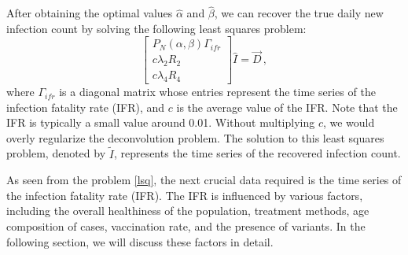 \documentclass[sn-mathphys,Numbered]{sn-jnl}
\begin{document}
After obtaining the optimal values $\hat{\alpha}$ and $\hat{\beta}$, we can recover the true daily new infection count by solving the following least squares problem:
\begin{equation}
    \begin{bmatrix}
        P_{N}(\alpha, \beta) \Gamma_{ifr}\\
        c\lambda_{2}  R_{2}\\
        c\lambda_{4} R_{4}
    \end{bmatrix}
    \hat{I} = \vec{D} \,,\label{lsq}
\end{equation}
where $\Gamma_{ifr}$ is a diagonal matrix whose entries represent the time series of the infection fatality rate (IFR), and $c$ is the average value of the IFR. Note that the IFR is typically a small value around 0.01. Without multiplying $c$, we would overly regularize the deconvolution problem. The solution to this least squares problem, denoted by $\tilde{I}$, represents the time series of the recovered infection count.

As seen from the problem \eqref{lsq}, the next crucial data required is the time series of the infection fatality rate (IFR). The IFR is influenced by various factors, including the overall healthiness of the population, treatment methods, age composition of cases, vaccination rate, and the presence of variants. In the following section, we will discuss these factors in detail.






\end{document}
